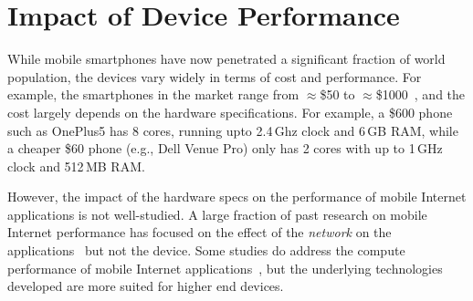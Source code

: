 

\section{Impact of Device Performance} \label{intro}


While mobile smartphones have now penetrated 
a significant fraction of world population, the devices 
vary widely in terms of cost and performance. 
For example, the smartphones in the market 
range from $\approx$\$50 to $\approx$\$1000~\cite{mobilephones, contreras2017patents}, and the cost 
largely depends on the hardware specifications. 
For example, a \$600 phone such as OnePlus5 has 8 cores, running upto 2.4\,Ghz clock and 6\,GB RAM, while a cheaper \$60 phone (e.g., Dell Venue Pro) only has 2 cores with up to 1\,GHz clock and 512\,MB RAM. 

However, the impact of the hardware specs
on the performance of mobile Internet applications is not well-studied. A large fraction of past research on mobile Internet performance has focused on the effect of the {\em network} on the applications~\cite{butkiewicz2015klotski, kelton2017improving, singh2015flexiweb, Ruamviboonsuk:2017:VAM:3098822.3098851, Shafiqund, Xiaodash2m, chen2016effective} but not 
the device. Some studies do address the compute performance of mobile Internet applications~\cite{zhu2017optimizing,jones2009parallelizing,mai2012case}, but the underlying
technologies developed are more suited for higher end devices. 


